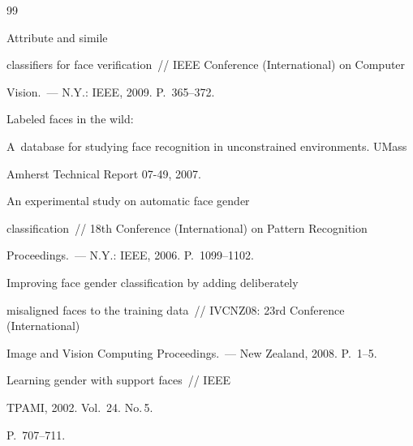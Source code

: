 {\small\frenchspacing


{%




\begin{thebibliography}{99}







 Attribute and simile 


classifiers for face verification~/\!\!/ IEEE Conference (International) on Computer 


Vision.~--- N.Y.: IEEE, 2009. P.~365--372.







 Labeled faces in the wild: 


A~database for studying face recognition in unconstrained environments. UMass 


Amherst Technical Report 07-49, 2007. 







 An experimental study on automatic face gender 


classification~/\!\!/ 18th Conference (International) on Pattern Recognition 


Proceedings.~--- N.Y.: IEEE, 2006. P.~1099--1102. 







 Improving face gender classification by adding deliberately 


misaligned faces to the training data~/\!\!/ IVCNZ08:  23rd Conference (International) 


Image and Vision Computing Proceedings.~---  New Zealand, 2008. P.~1--5.




 Learning gender with support faces~/\!\!/ IEEE 


TPAMI, 2002. Vol.~24. No.\,5. 


P.~707--711.






\end{thebibliography}}}
